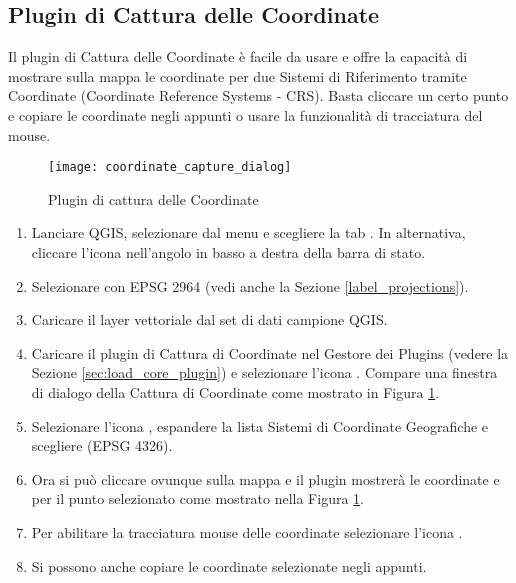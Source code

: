 
\subsection{Plugin di Cattura delle Coordinate}


Il plugin di Cattura delle Coordinate è facile da usare e offre la capacità di mostrare sulla mappa le coordinate per due Sistemi di Riferimento tramite Coordinate (Coordinate Reference Systems - CRS). Basta cliccare un certo punto e copiare le coordinate negli appunti o usare la funzionalità di tracciatura del mouse.

\begin{figure}[ht]
   \begin{center}
   \caption{Plugin di cattura delle Coordinate\nixcaption}\label{fig:coordinate_capture_dialog}\smallskip
   \texttt{[image: coordinate\_capture\_dialog]}
\end{center}  
\end{figure}

\begin{enumerate}
  \item Lanciare QGIS, selezionare  dal menu
   e scegliere la tab . In alternativa, cliccare l'icona  nell'angolo in basso a destra della barra di stato.
  \item Selezionare  
  con EPSG 2964 (vedi anche la Sezione \ref{label_projections}).
  \item Caricare il layer vettoriale  dal set di dati campione QGIS.
  \item Caricare il plugin di Cattura di Coordinate nel Gestore dei Plugins (vedere la Sezione 
  \ref{sec:load_core_plugin}) e selezionare l'icona . Compare una finestra di dialogo della Cattura di Coordinate come mostrato in Figura \ref{fig:coordinate_capture_dialog}.
  \item Selezionare l'icona , espandere la lista Sistemi di Coordinate Geografiche e scegliere  (EPSG 4326).
  \item Ora si può cliccare ovunque sulla mappa e il plugin mostrerà le coordinate 
   e  per il punto selezionato come mostrato nella Figura \ref{fig:coordinate_capture_dialog}.
  \item Per abilitare la tracciatura mouse delle coordinate selezionare l'icona .
  \item Si possono anche copiare le coordinate selezionate negli appunti.
\end{enumerate}

\newpage



